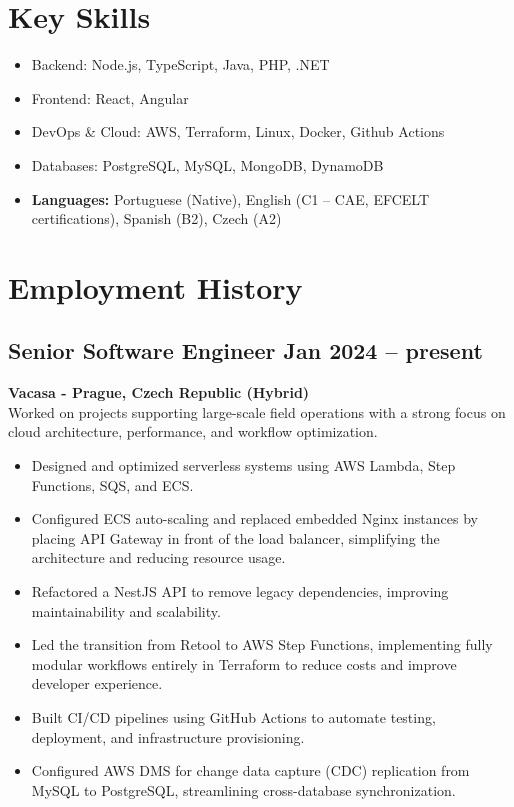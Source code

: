 \documentclass[11pt,a4paper]{article}
\begin{document}
\section*{\faTools\hspace{0.5em}Key Skills}
\begin{itemize}[leftmargin=*]
  \item Backend: Node.js, TypeScript, Java, PHP, .NET
  \item Frontend: React, Angular
  \item DevOps \& Cloud: AWS, Terraform, Linux, Docker, Github Actions
  \item Databases: PostgreSQL, MySQL, MongoDB, DynamoDB
  \item \textbf{Languages:} Portuguese (Native), English (C1 – CAE, EFCELT certifications), Spanish (B2), Czech (A2)
\end{itemize}

\section*{\faBriefcase\hspace{0.5em}Employment History}

\subsection*{Senior Software Engineer \hfill Jan 2024 -- present}
\textbf{Vacasa - Prague, Czech Republic (Hybrid)} \\
Worked on projects supporting large-scale field operations with a strong focus on cloud architecture, performance, and workflow optimization.
\begin{itemize}[leftmargin=*]
  \item Designed and optimized serverless systems using AWS Lambda, Step Functions, SQS, and ECS.
  \item Configured ECS auto-scaling and replaced embedded Nginx instances by placing API Gateway in front of the load balancer, simplifying the architecture and reducing resource usage.
  \item Refactored a NestJS API to remove legacy dependencies, improving maintainability and scalability.
  \item Led the transition from Retool to AWS Step Functions, implementing fully modular workflows entirely in Terraform to reduce costs and improve developer experience.
  \item Built CI/CD pipelines using GitHub Actions to automate testing, deployment, and infrastructure provisioning.
  \item Configured AWS DMS for change data capture (CDC) replication from MySQL to PostgreSQL, streamlining cross-database synchronization.
\end{itemize}
\end{document}
